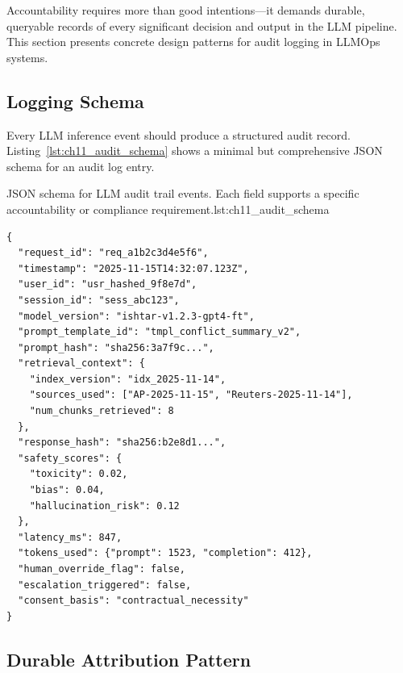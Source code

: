 Accountability requires more than good intentions---it demands durable, queryable records of every significant decision and output in the LLM pipeline. This section presents concrete design patterns for audit logging in LLMOps systems.

\subsection{Logging Schema}\label{sec:ch11_logging_schema}

Every LLM inference event should produce a structured audit record. Listing~\ref{lst:ch11_audit_schema} shows a minimal but comprehensive JSON schema for an audit log entry.

\begin{codebox}{JSON schema for LLM audit trail events. Each field supports a specific accountability or compliance requirement.}{lst:ch11_audit_schema}
\begin{verbatim}
{
  "request_id": "req_a1b2c3d4e5f6",
  "timestamp": "2025-11-15T14:32:07.123Z",
  "user_id": "usr_hashed_9f8e7d",
  "session_id": "sess_abc123",
  "model_version": "ishtar-v1.2.3-gpt4-ft",
  "prompt_template_id": "tmpl_conflict_summary_v2",
  "prompt_hash": "sha256:3a7f9c...",
  "retrieval_context": {
    "index_version": "idx_2025-11-14",
    "sources_used": ["AP-2025-11-15", "Reuters-2025-11-14"],
    "num_chunks_retrieved": 8
  },
  "response_hash": "sha256:b2e8d1...",
  "safety_scores": {
    "toxicity": 0.02,
    "bias": 0.04,
    "hallucination_risk": 0.12
  },
  "latency_ms": 847,
  "tokens_used": {"prompt": 1523, "completion": 412},
  "human_override_flag": false,
  "escalation_triggered": false,
  "consent_basis": "contractual_necessity"
}
\end{verbatim}
\end{codebox}

\subsection{Durable Attribution Pattern}\label{sec:ch11_attribution}

